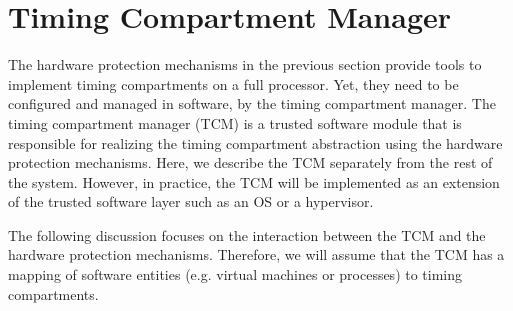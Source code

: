 % 

\section{Timing Compartment Manager}
\label{sec:integration_tcm}
The hardware protection mechanisms in the previous section provide tools
to implement timing compartments on a full processor. Yet, they need to be
configured and managed in software, by the timing compartment manager. 
The timing compartment manager (TCM) is a trusted software module that is
responsible for realizing the timing compartment abstraction using the
hardware protection mechanisms.
Here, we describe the TCM separately from the rest of the system.
However, in practice, the TCM will be implemented as an extension of the trusted software
layer such as an OS or a hypervisor.

The following discussion focuses on the interaction between the TCM and the 
hardware protection mechanisms. Therefore, we will assume that the TCM has
a mapping of software entities (e.g. virtual machines or processes) to timing 
compartments.


